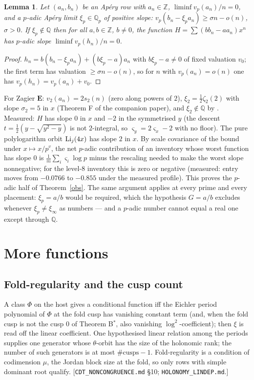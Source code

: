 \documentclass[11pt]{amsart}
\newtheorem{lemma}[theorem]{Lemma}
\theoremstyle{remark}
\newcommand{\Z}{\mathbb Z}\newcommand{\Q}{\mathbb Q}\newcommand{\R}{\mathbb R}\newcommand{\C}{\mathbb C}
\begin{document}
\begin{lemma}\label{slope}
Let $(a_n,b_n)$ be an Ap\'ery row with $a_n\in\Z$, $\liminf v_p(a_n)/n=0$, and a $p$-adic Ap\'ery limit $\xi_p\in\Q_p$ of positive slope: $v_p(b_n-\xi_pa_n)\ge\sigma n-o(n)$, $\sigma>0$. If $\xi_p\notin\Q$ then for all $a,b\in\Z$, $b\ne0$, the function $H=\sum(bb_n-aa_n)x^n$ has $p$-adic slope $\liminf v_p(h_n)/n=0$.
\end{lemma}
\begin{proof} $h_n=b(b_n-\xi_pa_n)+(b\xi_p-a)a_n$ with $b\xi_p-a\ne0$ of fixed valuation $v_0$; the first term has valuation $\ge\sigma n-o(n)$, so for $n$ with $v_p(a_n)=o(n)$ one has $v_p(h_n)=v_p(a_n)+v_0$. \end{proof}
For Zagier $\mathbf E$: $v_2(a_n)=2s_2(n)$ (zero along powers of $2$), $\xi_2=\tfrac12\zeta_2(2)$ with slope $\sigma_2=5$ in $x$ (Theorem F of the companion paper), and $\xi_2\notin\Q$ by \cite{Cal05}. Measured: $H$ has slope $0$ in $x$ and $-2$ in the symmetrised $y$ (the descent $t=\tfrac12(y-\sqrt{y^2-y})$ is not $2$-integral, so $\varsigma_y=2\varsigma_x-2$ with no floor). The pure polylogarithm orbit $\mathrm{Li}_j(4x)$ has slope $2$ in $x$. By scale covariance of the bound under $x\mapsto x/p^v$, the net $p$-adic contribution of an inventory whose worst function has slope $0$ is $\tfrac1m\sum_i\varsigma_i\log p$ minus the rescaling needed to make the worst slope nonnegative; for the level-$8$ inventory this is zero or negative (measured: entry moves from $-0.0766$ to $-0.855$ under the measured profile). This proves the $p$-adic half of Theorem~\ref{obs}. The same argument applies at every prime and every placement: $\xi_p=a/b$ would be required, which the hypothesis $G=a/b$ excludes whenever $\xi_p\ne\xi_\infty$ as numbers --- and a $p$-adic number cannot equal a real one except through $\Q$.

\section{More functions}
\subsection{Fold-regularity and the cusp count} A class $\Phi$ on the host gives a conditional function iff the Eichler period polynomial of $\Phi$ at the fold cusp has vanishing constant term (and, when the fold cusp is not the cusp $0$ of Theorem B$^*$, also vanishing $\log^2$-coefficient); then $\xi$ is read off the linear coefficient. One hypothesised linear relation among the periods supplies one generator whose $\theta$-orbit has the size of the holonomic rank; the number of such generators is at most $\#\text{cusps}-1$. Fold-regularity is a condition of codimension $\mu$, the Jordan block size at the fold, so only rows with simple dominant root qualify. [\texttt{CDT\_NONCONGRUENCE.md} \S10; \texttt{HOLONOMY\_LINDEP.md}.]
\end{document}
